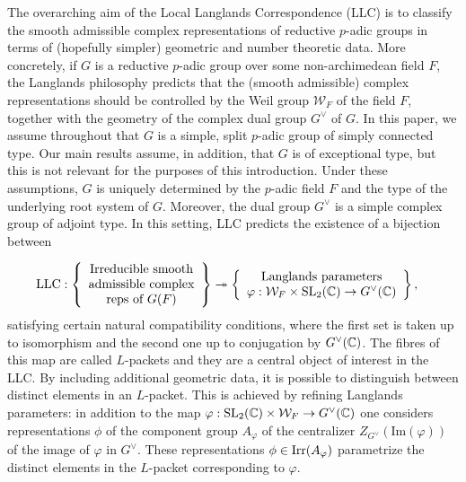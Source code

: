 The overarching aim of the Local Langlands Correspondence (LLC) is to classify the smooth admissible complex representations of reductive $p$-adic groups in terms of (hopefully simpler) geometric and number theoretic data. More concretely, if $G$ is a reductive $p$-adic group over some non-archimedean field $F$, the Langlands philosophy predicts that the (smooth admissible) complex representations should be controlled by the Weil group $\mathcal{W}_F$ of the field $F$, together with the geometry of the complex dual group $G^\vee$ of $G$. In this paper, we assume throughout that $G$ is a simple, split $p$-adic group of simply connected type. Our main results assume, in addition, that $G$ is of exceptional type, but this is not relevant for the purposes of this introduction. Under these assumptions, $G$ is uniquely determined by the $p$-adic field $F$ and the type of the underlying root system of $G$. Moreover, the dual group $G^\vee$ is a simple complex group of adjoint type. In this setting, LLC predicts the existence of a bijection between 

\begin{align*}
    \mathrm{LLC}:\left\{
    \begin{array}{c}
        \text{Irreducible smooth} \\
        \text{admissible complex} \\
        \text{reps of } G(F)
    \end{array}
    \right\}
    &\twoheadrightarrow
    \left\{
    \begin{array}{c}
        \text{Langlands parameters}\\
        \varphi: \mathcal{W}_F \times \mathrm{SL}_2(\mathbb{C}) \to G^\vee(\mathbb{C})        
    \end{array}
    \right\},
\end{align*}
satisfying certain natural compatibility conditions, where the first set is taken up to isomorphism and the second one up to conjugation by $G^\vee(\mathbb{C})$. The fibres of this map are called $L$-packets and they are a central object of interest in the LLC. By including additional geometric data, it is possible to distinguish between distinct elements in an $L$-packet. This is achieved by refining Langlands parameters: in addition to the map $\varphi:\mathrm{SL}_2(\mathbb{C})\times \mathcal{W}_F \to G^\vee(\mathbb{C})$ one considers representations $\phi$ of the component group $A_\varphi$ of the centralizer $Z_{G^\vee}(\textrm{Im}(\varphi))$ of the image of $\varphi$ in $G^\vee$. These representations $\phi\in\mathrm{Irr}(A_\varphi)$ parametrize the distinct elements in the $L$-packet corresponding to $\varphi$.

